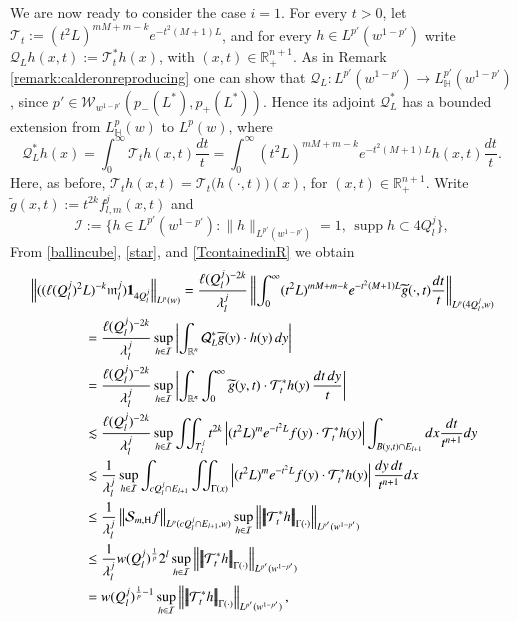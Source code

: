 \documentclass[11pt, a4paper,leqno]{amsart}
\newcommand{\mm}{\mathfrak{m}}
\renewcommand{\chi}{{\bf 1}}
\theoremstyle{plain}
\theoremstyle{definition}
\theoremstyle{remark}
\numberwithin{equation}{section}
\def \R{ \mathbb{R} }
\def \Scal{ \mathcal{S} }
\def \hh{ \mathrm{H} }
\def \iint{\int\!\!\!\int}
\DeclareMathOperator{\supp}{supp}
\begin{document}
We are now ready to consider the case $i=1$. For every $t>0$, let $\mathcal{T}_t:=(t^2L)^{mM+m-k}e^{-t^2(M+1)L}$, and for every  $h\in L^{p'}(w^{1-p'})$ write $\mathcal{Q}_Lh(x,t):=\mathcal{T}_t^*h(x)$, with $(x,t)\in \R^{n+1}_+$. As in Remark \ref{remark:calderonreproducing} 
one can show that $\mathcal{Q}_L:L^{p'}(w^{1-p'})\rightarrow L^{p'}_{\mathbb{H}}(w^{1-p'})$, since 
$p'\in \mathcal{W}_{w^{1-p'}}(p_-(L^*),p_+(L^*))$. Hence its adjoint $\mathcal{Q}_L^*$ has a bounded extension from $L^{p}_{\mathbb{H}}(w)$ to $L^{p}(w)$, where
$$
\mathcal{Q}_L^*h(x)
=
\int_0^{\infty} \mathcal{T}_t h(x,t)\frac{dt}{t}
=
\int_0^{\infty}(t^2L)^{mM+m-k}e^{-t^2(M+1)L}h(x,t)\frac{dt}{t}.
$$
Here, as before, $\mathcal{T}_t h(x,t)=\mathcal{T}_t\big(h(\cdot,t)\big)(x)$, for $(x,t)\in\R_+^{n+1}$.
Write $\widetilde{g}(x,t):=t^{2k}{f}_{l,m}^j(x,t)$ and
$$
\mathcal{I}:=\big\{h\in L^{p'}(w^{1-p'}): \|h\|_{L^{p'}(w^{1-p'})}=1,\,\supp h\subset 4Q_l^j\big\},
$$
From \eqref{ballincube}, \eqref{star}, and \eqref{TcontainedinR} we obtain
\begin{align}\label{estimatemoleculei=1}
&\left\|((\ell(Q_l^j)^2L)^{-k}\mm_{l}^{j})\chi_{4Q_l^j}\right\|_{L^p(w)}
=
\frac{\ell(Q_l^j)^{-2k}}{\lambda^{j}_l} 
\left\|
\int_{0}^{\infty} (t^2L)^{mM+m-k}e^{-t^2(M+1)L}\widetilde{g}(\cdot,t)
\frac{dt}{t}\right\|_{L^p(4Q_{l}^j,w)}
\\
\nonumber&\qquad\qquad=
\frac{\ell(Q_l^j)^{-2k}}{\lambda^{j}_l} 
\sup_{h\in \mathcal{I}}\left|\int_{\R^n}\mathcal{Q}_L^*\widetilde{g}(y)\cdot h(y)\, dy
\right|
 \\
\nonumber&\qquad\qquad
=
\frac{\ell(Q_l^j)^{-2k}}{\lambda^{j}_l} 
\sup_{h\in \mathcal{I}}\left|\int_{\R^n}\int_0^{\infty}\widetilde{g}(y,t)\cdot \mathcal{T}_t^*h(y)\, \frac{dt\,dy}{t}
\right|
\\ \nonumber
 &\qquad\qquad
\lesssim 
\frac{\ell(Q_l^j)^{-2k}}{\lambda^{j}_l} 
\sup_{h\in \mathcal{I}}\iint_{T_l^j}t^{2k}\left|
(t^2L)^me^{-t^2L}f(y)\cdot \mathcal{T}_t^*h(y)\right|
\int_{B(y,t)\cap E_{l+1}}dx\frac{dt}{t^{n+1}}dy
\\ \nonumber
&\qquad\qquad
\lesssim 
\frac{1}{\lambda^{j}_l} 
\sup_{h\in \mathcal{I}}\int_{cQ_l^j\cap
E_{l+1}}\iint_{\Gamma(x)} \left|
(t^2L)^me^{-t^2L}f(y)\cdot \mathcal{T}_t^*h(y)\right|
\frac{dy \, dt}{t^{n+1}}dx
\\ \nonumber
&\qquad\qquad
\leq 
\frac{1}{\lambda^{j}_l} 
\left\| \Scal_{m,\hh} f\right\|_{L^{p}(cQ_l^j\cap
E_{l+1},w)} \sup_{h\in \mathcal{I}}\left\|\left|\!\left|\!\left|
\mathcal{T}_t^*h\right|\!\right|\!\right|_{\Gamma(\cdot)}\right\|_{L^{p'}(w^{1-p'})}
\\\nonumber
&
\qquad\qquad
\le
\frac{1}{\lambda^{j}_l} w(Q_l^j)^{\frac{1}{p}}2^l \sup_{h\in \mathcal{I}}\left\|\left|\!\left|\!\left|
\mathcal{T}_t^*h\right|\!\right|\!\right|_{\Gamma(\cdot)}\right\|_{L^{p'}(w^{1-p'})}
\\\nonumber
&
\qquad\qquad
=
w(Q_l^j)^{\frac{1}{p}-1}\sup_{h\in \mathcal{I}}\left\|\left|\!\left|\!\left|
\mathcal{T}_t^*h\right|\!\right|\!\right|_{\Gamma(\cdot)}\right\|_{L^{p'}(w^{1-p'})}
,
\end{align}
\end{document}
